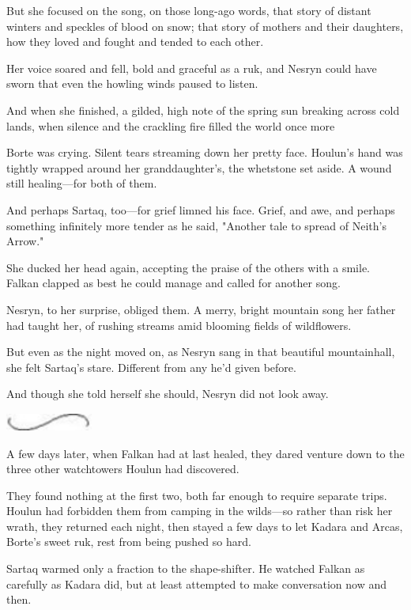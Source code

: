 But she focused on the song, on those long-ago words, that story of distant winters and speckles of blood on snow; that story of mothers and their daughters, how they loved and fought and tended to each other.

Her voice soared and fell, bold and graceful as a ruk, and Nesryn could have sworn that even the howling winds paused to listen.

And when she finished, a gilded, high note of the spring sun breaking across cold lands, when silence and the crackling fire filled the world once more 

Borte was crying. Silent tears streaming down her pretty face. Houlun's hand was tightly wrapped around her granddaughter's, the whetstone set aside. A wound still healing---for both of them.

And perhaps Sartaq, too---for grief limned his face. Grief, and awe, and perhaps something infinitely more tender as he said, "Another tale to spread of Neith's Arrow."

She ducked her head again, accepting the praise of the others with a smile. Falkan clapped as best he could manage and called for another song.

Nesryn, to her surprise, obliged them. A merry, bright mountain song her father had taught her, of rushing streams amid blooming fields of wildflowers.

But even as the night moved on, as Nesryn sang in that beautiful mountainhall, she felt Sartaq's stare. Different from any he'd given before.

And though she told herself she should, Nesryn did not look away.

\includegraphics[width=1.12in,height=0.24in]{images/seperator}

A few days later, when Falkan had at last healed, they dared venture down to the three other watchtowers Houlun had discovered.

They found nothing at the first two, both far enough to require separate trips. Houlun had forbidden them from camping in the wilds---so rather than risk her wrath, they returned each night, then stayed a few days to let Kadara and Arcas, Borte's sweet ruk, rest from being pushed so hard.

Sartaq warmed only a fraction to the shape-shifter. He watched Falkan as carefully as Kadara did, but at least attempted to make conversation now and then.

